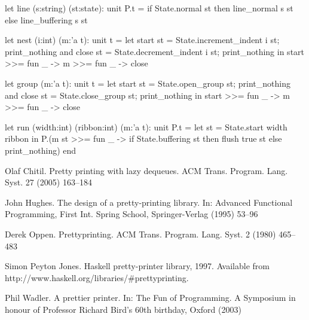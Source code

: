 \documentclass[12pt]{article}
\begin{document}
\begin{ocaml}
    let line (s:string) (st:state): unit P.t =
      if State.normal st then
        line_normal s st
      else
        line_buffering s st

    let nest (i:int) (m:'a t): unit t =
      let start st = State.increment_indent i st; print_nothing
      and close st = State.decrement_indent i st; print_nothing
      in
      start >>= fun _ -> m >>= fun _ -> close

    let group (m:'a t): unit t =
      let start st = State.open_group st;  print_nothing
      and close st = State.close_group st; print_nothing
      in
      start >>= fun _ -> m >>= fun _ -> close

    let run (width:int) (ribbon:int) (m:'a t): unit P.t =
      let st = State.start width ribbon in
      P.(m st >>= fun _ ->
         if State.buffering st then
           flush true st
         else
           print_nothing)
  end
\end{ocaml}


\begin{thebibliography}{99}

 Olaf Chitil. Pretty printing with lazy dequeues. ACM
  Trans. Program. Lang. Syst.  27 (2005) 163–184

 John Hughes. The design of a pretty-printing library. In:
  Advanced Functional Programming, First Int. Spring School, Springer-Verlag
  (1995) 53–96

 Derek Oppen. Prettyprinting. ACM
  Trans. Program. Lang. Syst. 2 (1980) 465–483

 Simon Peyton Jones. Haskell pretty-printer library,
  1997. Available from http://www.haskell.org/libraries/\#prettyprinting.

 Phil Wadler. A prettier printer. In: The Fun of
  Programming. A Symposium in honour of Professor Richard Bird’s 60th
  birthday, Oxford (2003)

\end{thebibliography}
\end{document}
